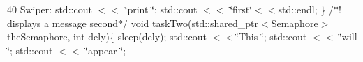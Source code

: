 40 Swiper\+: std\+::cout $<$$<$ \char`\"{}print \char`\"{}; std\+::cout $<$$<$ \char`\"{}first\char`\"{}$<$$<$std\+::endl; \} /$\ast$! displays a message second$\ast$/ void task\+Two(std\+::shared\+\_\+ptr$<$\+Semaphore$>$ the\+Semaphore, int dely)\{ sleep(dely); std\+::cout $<$$<$\char`\"{}\+This \char`\"{}; std\+::cout $<$$<$ \char`\"{}will \char`\"{}; std\+::cout $<$$<$ \char`\"{}appear \char`\"{}; 